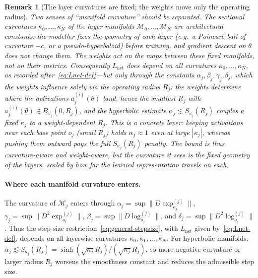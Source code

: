 \documentclass[letterpaper]{article}
\newtheorem{remark}[theorem]{Remark}
\begin{document}
\begin{remark}[The layer curvatures are fixed; the weights move only the operating radius]
\label{rem:fixed-curvature}
Two senses of ``manifold curvature'' should be separated. The sectional
curvatures $\kappa_0,\dots,\kappa_N$ of the layer manifolds
$\mathcal M_0,\dots,\mathcal M_N$ are \emph{architectural constants}: the
modeller fixes the geometry of each layer (e.g.\ a Poincar\'e ball of
curvature $-c$, or a pseudo-hyperboloid) before training, and gradient descent
on $\theta$ does \emph{not} change them. The weights act on the \emph{maps
between} these fixed manifolds, not on their metrics. Consequently
$L_{\mathrm{net}}$ does depend on \emph{all} curvatures
$\kappa_0,\dots,\kappa_N$, as recorded after~\eqref{eq:Lnet-def}---but only
through the constants $\alpha_j,\beta_j,\gamma_j,\delta_j$, which the weights
influence solely via the \emph{operating radius} $R_j$: the weights determine
where the activations $a_j^{(i)}(\theta)$ land, hence the smallest $R_j$ with
$a_j^{(i)}(\theta)\in B_{V_j}(0,R_j)$, and the hyperbolic estimate
$\alpha_j\lesssim S_{\kappa_j}(R_j)$ couples a fixed $\kappa_j$ to a
weight-dependent $R_j$. This is a concrete lever: keeping activations near each
base point $o_j$ (small $R_j$) holds $\alpha_j\approx1$ even at large
$|\kappa_j|$, whereas pushing them outward pays the full $S_{\kappa_j}(R_j)$
penalty. The bound is thus curvature-aware \emph{and} weight-aware, but the
curvature it sees is the fixed geometry of the layers, scaled by how far the
learned representation travels on each.
\end{remark}
\paragraph{Where each manifold curvature enters.}
The curvature of \(\mathcal M_j\) enters through
\(\alpha_j = \sup \|D\exp_{o_j}^{(j)}\|\),
\(\gamma_j = \sup \|D^2\exp_{o_j}^{(j)}\|\),
\(\beta_j = \sup \|D\log_{o_j}^{(j)}\|\), and
\(\delta_j = \sup \|D^2\log_{o_j}^{(j)}\|\). Thus the step size
restriction~\eqref{eq:general-stepsize}, with $L_{\mathrm{net}}$ given
by~\eqref{eq:Lnet-def}, depends on all layerwise
curvatures \(\kappa_0,\kappa_1,\dots,\kappa_N\). For hyperbolic manifolds,
\(\alpha_j \lesssim S_{\kappa_j}(R_j) = \sinh(\sqrt{\kappa_j}R_j)/(\sqrt{\kappa_j}R_j)\),
so more negative curvature or larger radius \(R_j\) worsens the smoothness
constant and reduces the admissible step size.
\end{document}

